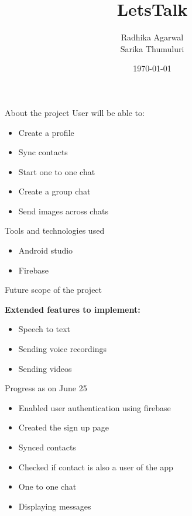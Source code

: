 \documentclass{beamer}
\title{LetsTalk}
\author{Radhika Agarwal\\
 Sarika Thumuluri}
\date{\today}
\begin{document}
\frame{\titlepage}
 


\begin{frame}{About the project}
User will be able to:
    \begin{itemize}
        \item Create a profile 
        \pause
        \item Sync contacts
        \pause
        \item Start one to one chat
        \pause
        \item Create a group chat 
        \pause
        \item Send images across chats 
    \end{itemize}

\end{frame}


\begin{frame}{Tools and technologies used}
\begin{itemize}
\item Android studio
\item Firebase
\end{itemize}
\end{frame}


\begin{frame}{Future scope of the project}

\textbf{Extended features to implement:}\newline\pause
\begin{itemize}
\item Speech to text
\pause
\item Sending voice recordings
\pause
\item Sending videos
\end{itemize}
\end{frame}


\begin{frame}{Progress as on June 25}
\begin{itemize}
\item Enabled user authentication using firebase
\item Created the sign up page
\item Synced contacts
\item Checked if contact is also a user of the app
\item One to one chat
\item Displaying messages
\end{itemize}
\end{frame}
\end{document}
